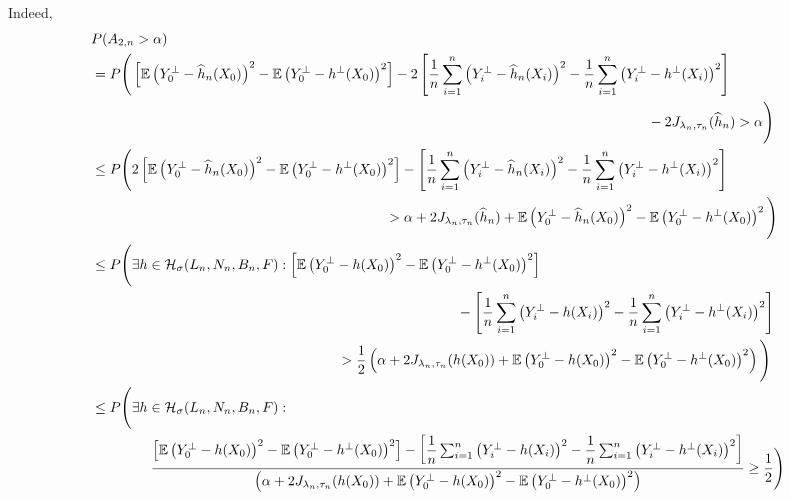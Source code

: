 \documentclass[10pt,twoside]{article}
\numberwithin{equation}{section}
\newcommand{\E}{\ensuremath{\mathbb{E}}}
\begin{document}
Indeed,
%
\begin{align*}
\nonumber & P (A_ {2, n} > \alpha)  
\\
\nonumber & = P\Bigg(\left[\E \left(Y_0^ {\bot} - \widehat{h}_n (X_0) \right) ^2   -  \E \left(Y_0^ {\bot}  - h^ {\bot} (X_0) \right) ^2 \right] 
- 2 \left[ \dfrac{1}{n} \sum_{i=1}^n \left(Y_i^ {\bot} - \widehat{h}_n (X_i) \right) ^2  -  \dfrac{1}{n} \sum_{i=1}^n \left(Y_i^ {\bot}   - h^ {\bot} (X_i) \right) ^2 \right] \\
  & \hspace{14cm} - 2  J_{\lambda_n, \tau_n}(\widehat{h}_n) > \alpha \Bigg) 
\\
\nonumber & \leq P\Bigg(2 \left[\E \left(Y_0^ {\bot} - \widehat{h}_n (X_0) \right) ^2  -  \E \left(Y_0^ {\bot}  - h^ {\bot} (X_0) \right) ^2 \right] 
 - \left[\dfrac{1}{n} \sum_{i=1}^n \left(Y_i^ {\bot}  - \widehat{h}_n (X_i) \right) ^2   -  \dfrac{1}{n} \sum_{i=1}^n \left(Y_i^ {\bot}  - h^{\bot} (X_i) \right) ^2 \right] 
 \\
\nonumber & \hspace{7.4cm} > \alpha + 2 J_{\lambda_n, \tau_n}(\widehat{h}_n) + \E \left(Y_0^ {\bot}  - \widehat{h}_n (X_0) \right) ^2 -  \E\left(Y_0^ {\bot}  - h^ {\bot} (X_0) \right) ^2 \Bigg) 
\\
\nonumber  & \leq  P\Bigg( \exists h \in \mathcal{H}_ {\sigma}(L_n, N_n, B_n, F) : \left[ \E \left(Y_0^ {\bot} - h(X_0) \right) ^2  -  \E \left(Y_0^ {\bot}  - h^ {\bot} (X_0) \right) ^2 \right]  \\
& \hspace{9.2cm} - \left[\dfrac{1}{n} \sum_{i=1}^n \left(Y_i^{\bot} - h (X_i)  \right) ^2  -  \dfrac{1}{n} \sum_{i=1}^n \left(Y_i^ {\bot}  - h^{\bot} (X_i) \right) ^2 \right]  
 \\
\nonumber  & \hspace{6.2cm} > \dfrac{1}{2} \left(\alpha + 2 J_{\lambda_n, \tau_n}(h (X_0)) + \E \left(Y_0^ {\bot} - h (X_0) \right) ^2  -  \E \left(Y_0^ {\bot}  - h^ {\bot} (X_0) \right) ^2 \right) \Bigg)
\\
 \nonumber  & \leq  P\Bigg( \exists h \in \mathcal{H}_ {\sigma}(L_n, N_n, B_n, F): \\
 \nonumber  & \hspace{1.5cm}  \dfrac{\left[ \E \left(Y_0^ {\bot} - h (X_0) \right) ^2   -  \E \left(Y_0^ {\bot}  - h^ {\bot} (X_0) \right) ^2  \right] 
 - \left[ \dfrac{1}{n} \sum_{i=1}^n \left(Y_i^{\bot}  - h (X_i) \right) ^2  -  \dfrac{1}{n} \sum_{i=1}^n \left(Y_i^{\bot}  - h^{\bot} (X_i) \right) ^2 \right] }{\left( \alpha + 2 J_{\lambda_n, \tau_n} (h (X_0)) + \E\left(Y_0^{\bot} - h (X_0) \right) ^2 -  \E \left(Y_0^{\bot}  - h^ {\bot} (X_0) \right) ^2 \right)}  \ge \dfrac{1}{2}  \Bigg) 

\end{align*}
\end{document}
